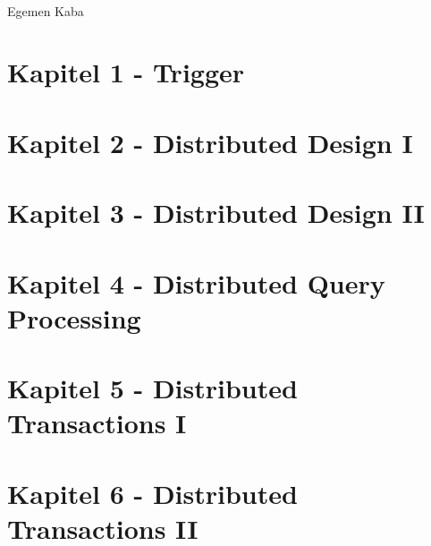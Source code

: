 \documentclass[a4paper,11pt]{article}
\begin{document}
\setcounter{tocdepth}{5}




\begin{center}

\vspace{48pt}


\begin{Huge}
\end{Huge}\\ 
\vspace{10pt}
\begin{center}
\begin{Large}
Egemen Kaba
\end{Large}
\end{center}

\vspace{10pt}



\end{center}

\newpage


\newpage

\tableofcontents



\vspace{12pt}


\newpage
\section{Kapitel 1 - Trigger}
\section{Kapitel 2 - Distributed Design I}
\section{Kapitel 3 - Distributed Design II}
\section{Kapitel 4 - Distributed Query Processing}
\section{Kapitel 5 - Distributed Transactions I}
\section{Kapitel 6 - Distributed Transactions II}
\end{document}

